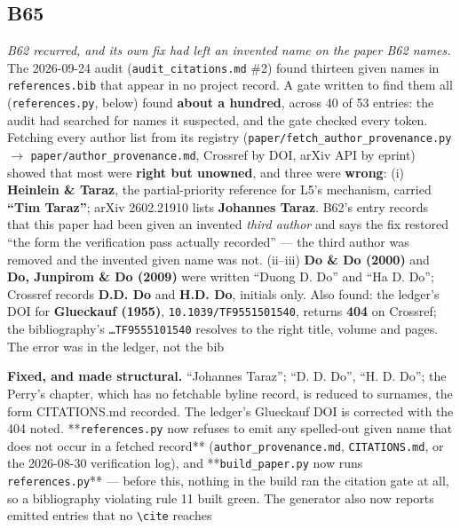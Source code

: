 \documentclass[10pt]{article}
\begin{document}
\subsection*{B65}\label{led:B65}
\begin{description}[leftmargin=0pt,itemsep=1pt]
\item[Defect.] \emph{B62 recurred, and its own fix had left an invented name on the paper B62 names.} The 2026-09-24 audit (\texttt{audit\_citations.md} \#2) found thirteen given names in \texttt{references.bib} that appear in no project record. A gate written to find them all (\texttt{references.py}, below) found \textbf{about a hundred}, across 40 of 53 entries: the audit had searched for names it suspected, and the gate checked every token. Fetching every author list from its registry (\texttt{paper/fetch\_author\_provenance.py} $\rightarrow$ \texttt{paper/author\_provenance.md}, Crossref by DOI, arXiv API by eprint) showed that most were \textbf{right but unowned}, and three were \textbf{wrong}: (i) \textbf{Heinlein \& Taraz}, the partial-priority reference for L5's mechanism, carried \textbf{``Tim Taraz''}; arXiv 2602.21910 lists \textbf{Johannes Taraz}. B62's entry records that this paper had been given an invented \emph{third author} and says the fix restored ``the form the verification pass actually recorded'' --- the third author was removed and the invented given name was not. (ii--iii) \textbf{Do \& Do (2000)} and \textbf{Do, Junpirom \& Do (2009)} were written ``Duong D. Do'' and ``Ha D. Do''; Crossref records \textbf{D.D. Do} and \textbf{H.D. Do}, initials only. Also found: the ledger's DOI for \textbf{Glueckauf (1955)}, \texttt{10.1039/TF9551501540}, returns \textbf{404} on Crossref; the bibliography's \texttt{\ldots{}TF9555101540} resolves to the right title, volume and pages. The error was in the ledger, not the bib
\item[Resolution.] \textbf{Fixed, and made structural.} ``Johannes Taraz''; ``D. D. Do'', ``H. D. Do''; the Perry's chapter, which has no fetchable byline record, is reduced to surnames, the form CITATIONS.md recorded. The ledger's Glueckauf DOI is corrected with the 404 noted. **\texttt{references.py} now refuses to emit any spelled-out given name that does not occur in a fetched record** (\texttt{author\_provenance.md}, \texttt{CITATIONS.md}, or the 2026-08-30 verification log), and **\texttt{build\_paper.py} now runs \texttt{references.py}** --- before this, nothing in the build ran the citation gate at all, so a bibliography violating rule 11 built green. The generator also now reports emitted entries that no \texttt{\textbackslash{}cite} reaches

\end{description}
\end{document}
